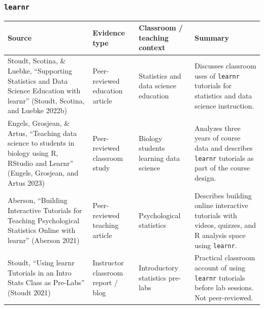 \documentclass[
  letterpaper,
  DIV=11,
  numbers=noendperiod]{scrartcl}
\begin{document}
\subsubsection{\texorpdfstring{\texttt{learnr}}{learnr}}\label{learnr}

\begin{longtable}[]{@{}
  >{\raggedright\arraybackslash}p{}
  >{\raggedright\arraybackslash}p{}
  >{\raggedright\arraybackslash}p{}
  >{\raggedright\arraybackslash}p{}@{}}
\toprule\noalign{}
\begin{minipage}[b]{\linewidth}\raggedright
Source
\end{minipage} & \begin{minipage}[b]{\linewidth}\raggedright
Evidence type
\end{minipage} & \begin{minipage}[b]{\linewidth}\raggedright
Classroom / teaching context
\end{minipage} & \begin{minipage}[b]{\linewidth}\raggedright
Summary
\end{minipage} \\
\midrule\noalign{}
\endhead
\bottomrule\noalign{}
\endlastfoot
Stoudt, Scotina, \& Luebke, ``Supporting Statistics and Data Science
Education with learnr'' (Stoudt, Scotina, and Luebke 2022b) &
Peer-reviewed education article & Statistics and data science education
& Discusses classroom uses of \texttt{learnr} tutorials for statistics
and data science instruction. \\
Engels, Grosjean, \& Artus, ``Teaching data science to students in
biology using R, RStudio and Learnr'' (Engels, Grosjean, and Artus 2023)
& Peer-reviewed classroom study & Biology students learning data science
& Analyzes three years of course data and describes \texttt{learnr}
tutorials as part of the course design. \\
Aberson, ``Building Interactive Tutorials for Teaching Psychological
Statistics Online with learnr'' (Aberson 2021) & Peer-reviewed teaching
article & Psychological statistics & Describes building online
interactive tutorials with videos, quizzes, and R analysis space using
\texttt{learnr}. \\
Stoudt, ``Using learnr Tutorials in an Intro Stats Class as Pre-Labs''
(Stoudt 2021) & Instructor classroom report / blog & Introductory
statistics pre-labs & Practical classroom account of using
\texttt{learnr} tutorials before lab sessions. Not peer-reviewed. \\
\end{longtable}
\end{document}
